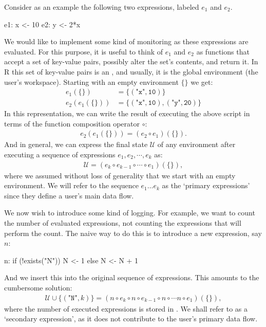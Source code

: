 Consider as an example the following two expressions, labeled $e_1$ and $e_2$.
\begin{example}
  e1:  x <- 10 
  e2:  y <- 2*x
\end{example}
We would like to implement some kind of monitoring as these expressions are
evaluated. For this purpose, it is useful to think of $e_1$ and $e_2$ as
functions that accept a set of key-value pairs, possibly alter the set's
contents, and return it. In R this set of key-value pairs is an
, and usually, it is the global environment (the user's
workspace). Starting with an empty environment $\{\}$ we get:
\begin{align*}
 e_1(\{\})        &= \{(\texttt{"x"},\texttt{10})\}\\
 e_2(e_1(\{\})) &= \{(\texttt{"x"}, \texttt{10}),(\texttt{"y"}, \texttt{20})\}
\end{align*}
In this representation, we can write the result of executing the above script
in terms of the function composition operator $\circ$:
\begin{align*}
e_2(e_1(\{\})) = (e_2\circ e_1)(\{\}).
\end{align*}
And in general, we can express the final state $\mathcal{U}$ of any environment after
executing a sequence of expressions $e_1,e_2,\cdots,e_k$ as:
\begin{align}
\mathcal{U} = (e_k\circ e_{k-1}\circ \cdots\circ e_1)(\{\}),
\label{eq:compose}
\end{align}
where we assumed without loss of generality that we start with an empty
environment. We will refer to the sequence $e_1\ldots e_k$ as the `primary
expressions' since they define a user's main data flow. 

We now wish to introduce some kind of logging. For example, we want to count
the number of evaluated expressions, not counting the expressions that will
perform the count. The naive way to do this is to introduce a new expression,
say $n$:
\begin{example}
  n:   if (!exists("N")) N <- 1 else N <- N + 1
\end{example}
And we insert this into the original sequence of expressions. This amounts to
the cumbersome solution:
\begin{align}
\mathcal{U}\cup\{(\texttt{"N"},k)\} = (n\circ e_k \circ n\circ e_{k-1}\circ n\circ \cdots n\circ e_{1})(\{\}),
\label{eq:insert}
\end{align}
where the number of executed expressions is stored in . We shall refer
to  as a `secondary expression', as it does not contribute to the
user's primary data flow.

